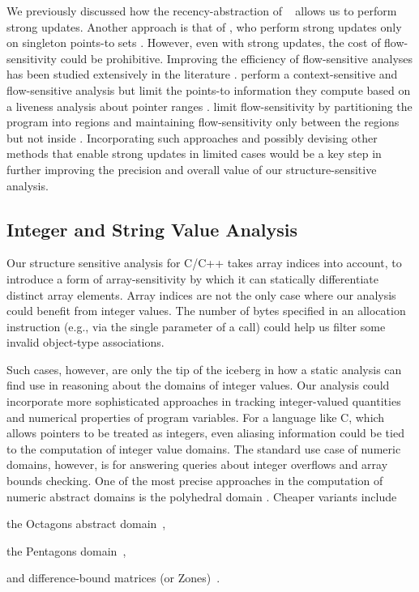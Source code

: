 We previously discussed how the recency-abstraction of
\citeauthor{sas/BalakrishnanR06}~\cite{sas/BalakrishnanR06} allows us
to perform strong updates.
%
Another approach is that of \citeauthor{popl/Lhotak11}, who perform
strong updates only on singleton points-to sets
\cite{popl/Lhotak11}.
%
However, even with strong updates, the cost of flow-sensitivity could
be prohibitive. Improving the efficiency of flow-sensitive analyses
has been studied extensively in the literature
\cite{sigsoft/LiCK11,sigsoft/SuiX16,ecoop/DeD12,iwmm/LiCK13}.
%
\citeauthor*{sas/KhedkerMR12} perform a context-sensitive and
flow-sensitive analysis but limit the points-to information they
compute based on a liveness analysis about pointer ranges
\cite{sas/KhedkerMR12}.
%
\citeauthor*{sas/YeSX14} limit flow-sensitivity by partitioning the
program into regions and maintaining flow-sensitivity only between the
regions but not inside \cite{sas/YeSX14}.
%
Incorporating such approaches and possibly devising other methods that
enable strong updates in limited cases would be a key step in
further improving the precision and overall value of our
structure-sensitive analysis.


\subsection{Integer and String Value Analysis}

Our structure sensitive analysis for C/C++ takes array indices into
account, to introduce a form of array-sensitivity by which it can
statically differentiate distinct array elements. Array indices are not
the only case where our analysis could benefit from integer values. The
number of bytes specified in an allocation instruction (e.g., via the
single parameter of a  call) could help us filter some
invalid object-type associations.

Such cases, however, are only the tip of the iceberg in how a static
analysis can find use in reasoning about the domains of integer
values. Our analysis could incorporate more sophisticated approaches
in tracking integer-valued quantities and numerical properties of
program variables. For a language like C, which allows pointers to be
treated as integers, even aliasing information could be tied to
the computation of integer value domains. The standard use case of
numeric domains, however, is for answering queries about integer overflows
and array bounds checking.
%
One of the most precise approaches in the computation of numeric
abstract domains is the polyhedral domain
\cite{popl/CousotH78}. Cheaper variants include
\begin{inparablank}
\item the Octagons abstract domain~\cite{journals/lisp/Mine06},
\item the Pentagons domain~\cite{sac/LogozzoF08},
\item and difference-bound matrices (or Zones)~\cite{pado/Mine01}.
\end{inparablank}

